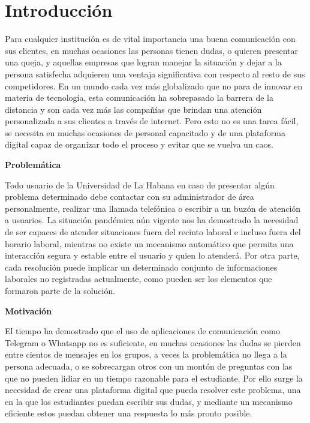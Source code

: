\chapter*{Introducción}\label{chapter:introduction}

Para cualquier institución es de vital importancia una buena comunicación con sus clientes, en muchas ocasiones las personas tienen dudas, o quieren presentar una queja, y aquellas empresas que logran manejar la situación y dejar a la persona satisfecha adquieren una ventaja significativa con respecto al resto de sus competidores. En un mundo cada vez más globalizado que no para de innovar en materia de tecnología, esta comunicación ha sobrepasado la barrera de la distancia y son cada vez más las compañías que brindan una atención personalizada a sus clientes a través de internet. Pero esto no es una tarea fácil, se necesita en muchas ocasiones de personal capacitado y de una plataforma digital capaz de organizar todo el proceso y evitar que se vuelva un caos.
\newline

\textbf{Problemática}
\newline

Todo usuario de la Universidad de La Habana en caso de presentar algún problema determinado debe contactar con su administrador de área personalmente, realizar una llamada telefónica o escribir a un buzón de atención a usuarios. La situación pandémica aún vigente nos ha demostrado la necesidad de ser capaces de atender situaciones fuera del recinto laboral e incluso fuera del horario laboral, mientras no existe un mecanismo automático que permita una interacción segura y estable entre el usuario y quien lo atenderá. Por otra parte, cada resolución puede implicar un determinado conjunto de informaciones laborales no registradas actualmente, como pueden ser los elementos que formaron parte de la solución.\newline

\textbf{Motivación}
\newline

El tiempo ha demostrado que el uso de aplicaciones de comunicación como Telegram o Whatsapp no es suficiente, en muchas ocasiones las dudas se pierden entre cientos de mensajes en los grupos, a veces la problemática no llega a la persona adecuada, o se sobrecargan otros con un montón de preguntas con las que no pueden lidiar en un tiempo razonable para el estudiante. Por ello surge la necesidad de crear una plataforma digital que pueda resolver este problema, una en la que los estudiantes puedan escribir sus dudas, y mediante un mecanismo eficiente estos puedan obtener una respuesta lo más pronto posible.
\newline

